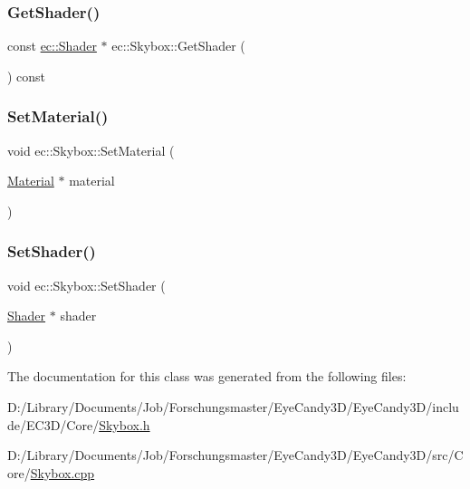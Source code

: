 \subsubsection{\texorpdfstring{Get\+Shader()}{GetShader()}\hspace{0.1cm}{\footnotesize\ttfamily [2/2]}}
{\footnotesize\ttfamily const \mbox{\hyperlink{classec_1_1_shader}{ec\+::\+Shader}} $\ast$ ec\+::\+Skybox\+::\+Get\+Shader (\begin{DoxyParamCaption}{ }\end{DoxyParamCaption}) const}

\mbox{\label{classec_1_1_skybox_a38672f2c699d1505eb84ca12861e9b4c}} 
\subsubsection{\texorpdfstring{Set\+Material()}{SetMaterial()}}
{\footnotesize\ttfamily void ec\+::\+Skybox\+::\+Set\+Material (\begin{DoxyParamCaption}\item[{\mbox{\hyperlink{classec_1_1_material}{Material}} $\ast$}]{material }\end{DoxyParamCaption})}

\mbox{\label{classec_1_1_skybox_a4d5f0d3ffa342987acb3e381be1a103d}} 
\subsubsection{\texorpdfstring{Set\+Shader()}{SetShader()}}
{\footnotesize\ttfamily void ec\+::\+Skybox\+::\+Set\+Shader (\begin{DoxyParamCaption}\item[{\mbox{\hyperlink{classec_1_1_shader}{Shader}} $\ast$}]{shader }\end{DoxyParamCaption})}



The documentation for this class was generated from the following files\+:\begin{DoxyCompactItemize}
\item 
D\+:/\+Library/\+Documents/\+Job/\+Forschungsmaster/\+Eye\+Candy3\+D/\+Eye\+Candy3\+D/include/\+E\+C3\+D/\+Core/\mbox{\hyperlink{_skybox_8h}{Skybox.\+h}}\item 
D\+:/\+Library/\+Documents/\+Job/\+Forschungsmaster/\+Eye\+Candy3\+D/\+Eye\+Candy3\+D/src/\+Core/\mbox{\hyperlink{_skybox_8cpp}{Skybox.\+cpp}}\end{DoxyCompactItemize}
